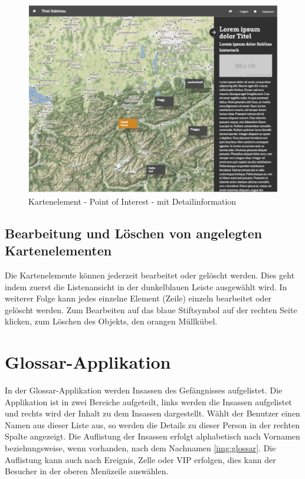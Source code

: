 \begin{figure}[ht!]
\centering
\includegraphics[width=12cm]{Figures/paula/karte/kartenelement_detail.png}
\caption{Kartenelement - Point of Interest - mit Detailinformation}
\label{img:kartenelement_detail}
\end{figure}

\subsection{Bearbeitung und Löschen von angelegten Kartenelementen}

Die Kartenelemente können jederzeit bearbeitet oder gelöscht werden. Dies geht indem zuerst die Listenansicht in der dunkelblauen Leiste ausgewählt wird. In weiterer Folge kann jedes einzelne Element (Zeile) einzeln bearbeitet oder gelöscht werden. Zum Bearbeiten auf das blaue Stiftsymbol auf der rechten Seite klicken, zum Löschen des Objekts, den orangen Müllkübel.




\cleardoublepage

\section{Glossar-Applikation}

In der Glossar-Applikation werden Insassen des Gefängnisses aufgelistet. Die Applikation ist in zwei Bereiche aufgeteilt, links werden die Insassen aufgelistet und rechts wird der Inhalt zu dem Insassen dargestellt. Wählt der Benutzer einen Namen aus dieser Liste aus, so werden die Details zu dieser Person in der rechten Spalte angezeigt. Die Auflistung der Insassen erfolgt alphabetisch nach Vornamen beziehungsweise, wenn vorhanden, nach dem Nachnamen \ref{img:glossar}.
Die Auflistung kann auch nach Ereignis, Zelle oder VIP erfolgen, dies kann der Besucher in der oberen Menüzeile auswählen.

